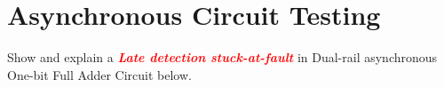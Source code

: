 \documentclass[a4paper, 10pt]{article}
\begin{document}
\subject
{}

\section{Asynchronous Circuit Testing}

\begin{problem}
Show and explain a \textbf{\textit{\textcolor{red}{Late detection stuck-at-fault}}} in Dual-rail asynchronous One-bit Full Adder Circuit below.

\begin{table}[htbp]
	\centering
	\begin{minipage}[c]{0.48\linewidth}
		\centering
		\renewcommand{\arraystretch}{1.4}
		\setlength{\tabcolsep}{8pt}


\end{minipage}
\end{table}
\end{problem}
\end{document}
